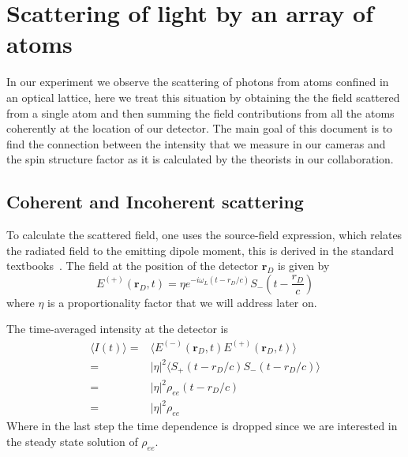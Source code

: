 \documentclass[11pt,letter]{article}
\newcommand{\bv}[1]{\ensuremath{\bm{#1}}}
\begin{document}
\section{Scattering of light by an array of atoms}

In our experiment we observe the scattering of photons from atoms confined in an optical lattice, here we treat this situation by obtaining the the field scattered from a single atom and then summing the field contributions from all the atoms coherently at the location of our detector.  The main goal of this document is to find the connection between the intensity that we measure in our cameras and the spin structure factor as it is calculated by the theorists in our collaboration.  

\subsection{Coherent and Incoherent scattering}

To calculate the scattered field, one uses the source-field expression, which relates the radiated field to the emitting dipole moment, this 
is derived in the standard textbooks~\cite{loudon2000quantum,cohen1998atom}.
The field at the position of the detector $\bv{r}_{D}$ is given by
\begin{equation}
E^{(+)}( \bv{r}_{D}, t) = \eta 
    e^{- i \omega_{L} ( t - r_{D}/c) } S_{-}\left(t - \frac{ r_{D} }{c} \right) 
\end{equation} 
where $\eta$ is a proportionality factor that we will address later on.  

The time-averaged intensity at the detector is 
\begin{equation}
\label{eq:Idef}
\begin{split}
\langle I (t) \rangle = & \langle E^{(-)}(\bv{r}_{D}, t) E^{(+)}(\bv{r}_{D}, t) \rangle \\
          = & |\eta|^{2} \langle S_{+}(t-r_{D}/c)S_{-}(t-r_{D}/c) \rangle  \\
          = & |\eta|^{2} \rho_{ee}( t- r_{D}/c )  \\
          = & |\eta|^{2} \rho_{ee}
\end{split} 
\end{equation}
Where in the last step the time dependence is dropped since we are interested in the steady state solution of $\rho_{ee}$.
\end{document}
